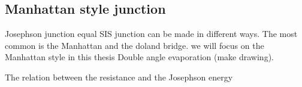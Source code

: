     \subsection{Manhattan style junction}
    Josephson junction equal SIS junction can be made in different ways. The most common is the Manhattan and the doland bridge. we will focus on the Manhattan style in this thesis
        Double angle evaporation (make drawing). 

        The relation between the resistance and the Josephson energy

